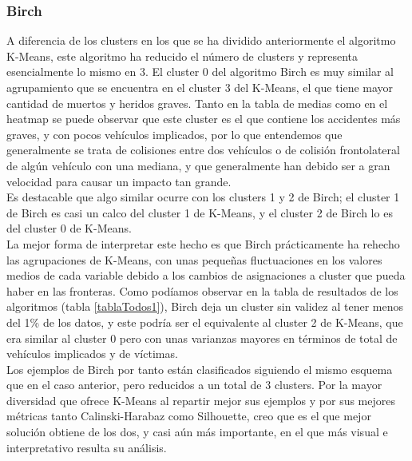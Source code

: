 	\subsubsection{Birch}
	A diferencia de los clusters en los que se ha dividido anteriormente el algoritmo K-Means, este algoritmo ha reducido el número de clusters y representa esencialmente lo mismo en 3. El cluster 0 del algoritmo Birch es muy similar al agrupamiento que se encuentra en el cluster 3 del K-Means, el que tiene mayor cantidad de muertos y heridos graves. Tanto en la tabla de medias como en el heatmap se puede observar que este cluster es el que contiene los accidentes más graves, y con pocos vehículos implicados, por lo que entendemos que generalmente se trata de colisiones entre dos vehículos o de colisión frontolateral de algún vehículo con una mediana, y que generalmente han debido ser a gran velocidad para causar un impacto tan grande.\\
	
	Es destacable que algo similar ocurre con los clusters 1 y 2 de Birch; el cluster 1 de Birch es casi un calco del cluster 1 de K-Means, y el cluster 2 de Birch lo es del cluster 0 de K-Means.\\
	
	La mejor forma de interpretar este hecho es que Birch prácticamente ha rehecho las agrupaciones de K-Means, con unas pequeñas fluctuaciones en los valores medios de cada variable debido a los cambios de asignaciones a cluster que pueda haber en las fronteras. Como podíamos observar en la tabla de resultados de los algoritmos (tabla \ref{tablaTodos1}), Birch deja un cluster sin validez al tener menos del 1\% de los datos, y este podría ser el equivalente al cluster 2 de K-Means, que era similar al cluster 0 pero con unas varianzas mayores en términos de total de vehículos implicados y de víctimas.\\
	
	Los ejemplos de Birch por tanto están clasificados siguiendo el mismo esquema que en el caso anterior, pero reducidos a un total de 3 clusters. Por la mayor diversidad que ofrece K-Means al repartir mejor sus ejemplos y por sus mejores métricas tanto Calinski-Harabaz como Silhouette, creo que es el que mejor solución obtiene de los dos, y casi aún más importante, en el que más visual e interpretativo resulta su análisis.
	
